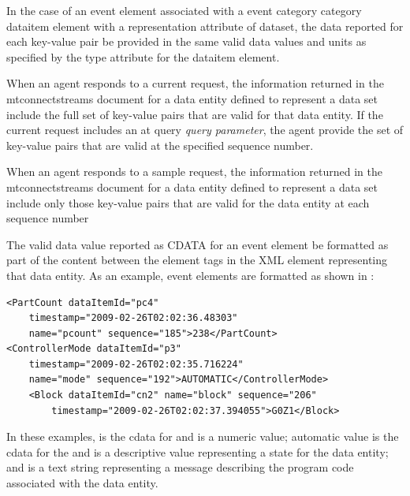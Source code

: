 \documentclass{mtconnect}	%
\providecommand{\DIFadd}[1]{{\hspace{0pt}\protect\color{blue}#1}} %
\providecommand{\DIFaddbegin}{} %
\providecommand{\DIFaddend}{} %
\begin{document}
\DIFaddbegin \DIFadd{In the case of an \gls{event} element associated with a \gls{event category} category \gls{dataitem} element with a \gls{representation} attribute of \gls{dataset}, the data reported for each \gls{key-value pair} \MUST be provided in the same \glspl{valid data value} and units as specified by the \gls{type} attribute for the \gls{dataitem} element.
}

\DIFadd{When an \gls{agent} responds to a \gls{current request}, the information returned in the \gls{mtconnectstreams} document for a \gls{data entity} defined to represent a \gls{data set} \MUST include the full set of \glspl{key-value pair} that are valid for that \gls{data entity}. If the \gls{current request} includes an \gls{at query} }\textit{\DIFadd{query parameter}}\DIFadd{, the \gls{agent} \MUST provide the set of \glspl{key-value pair} that are valid at the specified \gls{sequence number}.
}

\DIFadd{When an \gls{agent} responds to a \gls{sample request}, the information returned in the \gls{mtconnectstreams} document for a \gls{data entity} defined to represent a \gls{data set} \MUST include only those \glspl{key-value pair} that are valid for the \gls{data entity} at each \gls{sequence number}
}\DIFaddend 

The \gls{valid data value} reported as CDATA for an \gls{event} element \must be formatted as part of the content between the element tags in the XML element representing that \gls{data entity}.  As an example, \gls{event} elements are formatted as shown in :

\begin{lstlisting}[firstnumber=1,escapechar=|,%
    caption={Example of Event Element},label={lst:example-of-event-element}]
<PartCount dataItemId="pc4" 
    timestamp="2009-02-26T02:02:36.48303"
    name="pcount" sequence="185">238</PartCount>
<ControllerMode dataItemId="p3" 
    timestamp="2009-02-26T02:02:35.716224"
    name="mode" sequence="192">AUTOMATIC</ControllerMode>
    <Block dataItemId="cn2" name="block" sequence="206"
        timestamp="2009-02-26T02:02:37.394055">G0Z1</Block>
\end{lstlisting}


In these examples,  is the \gls{cdata} for  and is a numeric value; \gls{automatic value} is the \gls{cdata} for the  and is a descriptive value representing a state for the \gls{data entity}; and  is a text string representing a message describing the program code associated with the  \gls{data entity}. 
\end{document}

